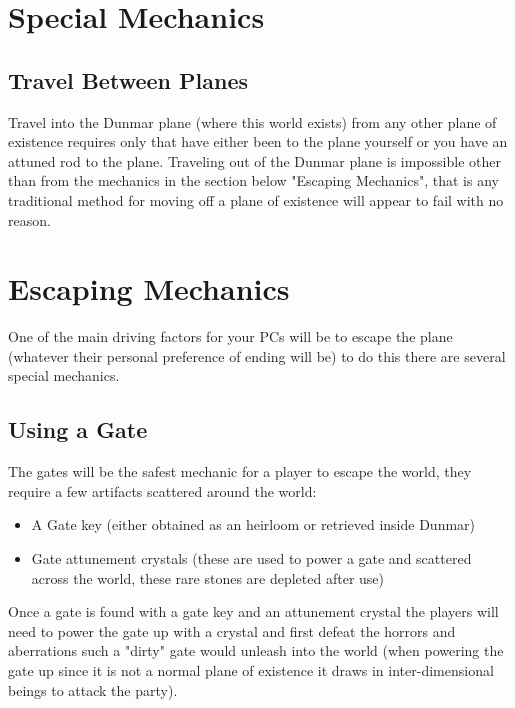 \documentclass[10pt,twoside,twocolumn]{article}
\begin{document}
\section{Special Mechanics}

\subsection{Travel Between Planes}
Travel into the Dunmar plane (where this world exists) from any other plane of existence requires only that have either been to the plane yourself or you have an attuned rod to the plane. Traveling out of the Dunmar plane is impossible other than from the mechanics in the section below "Escaping Mechanics", that is any traditional method for moving off a plane of existence will appear to fail with no reason.\\

\section{Escaping Mechanics}
One of the main driving factors for your PCs will be to escape the plane (whatever their personal preference of ending will be) to do this there are several special mechanics.\\

\subsection{Using a Gate}
The gates will be the safest mechanic for a player to escape the world, they require a few artifacts scattered around the world:\\

\begin{itemize}
\item A Gate key (either obtained as an heirloom or retrieved inside Dunmar)
\item Gate attunement crystals (these are used to power a gate and scattered across the world, these rare stones are depleted after use)
\end{itemize}

Once a gate is found with a gate key and an attunement crystal the players will need to power the gate up with a crystal and first defeat the horrors and aberrations such a "dirty" gate would unleash into the world (when powering the gate up since it is not a normal plane of existence it draws in inter-dimensional beings to attack the party).\\
\end{document}
